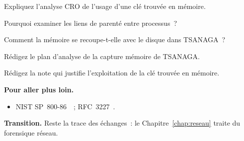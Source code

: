 \begin{boxexo}[title={\ding{45}\quad Exercice~12.6. CRO \niveaumoyen}]
Expliquez l'analyse CRO de l'usage d'une clé trouvée en mémoire.
\end{boxexo}

\begin{boxexo}[title={\ding{45}\quad Exercice~12.7. Parenté \niveaumoyen}]
Pourquoi examiner les liens de parenté entre processus~?
\end{boxexo}

\begin{boxexo}[title={\ding{45}\quad Exercice~12.8. Convergence \niveaumoyen}]
Comment la mémoire se recoupe-t-elle avec le disque dans TSANAGA~?
\end{boxexo}

\begin{boxexo}[title={\ding{45}\quad Exercice~12.9. Plan d'analyse \niveauexpert}]
Rédigez le plan d'analyse de la capture mémoire de TSANAGA.
\end{boxexo}

\begin{boxexo}[title={\ding{45}\quad Exercice~12.10. Justification \niveauexpert}]
Rédigez la note qui justifie l'exploitation de la clé trouvée en mémoire.
\end{boxexo}

\bigskip

\begin{boxinfo}
\textbf{Pour aller plus loin.}
\begin{itemize}
    \item NIST SP~800-86~\cite{nist80086}~; RFC~3227~\cite{rfc3227}.
\end{itemize}
\end{boxinfo}

\begin{boxinfo}
\textbf{Transition.} Reste la trace des échanges~: le
Chapitre~\ref{chap:reseau} traite du forensique réseau.
\end{boxinfo}

